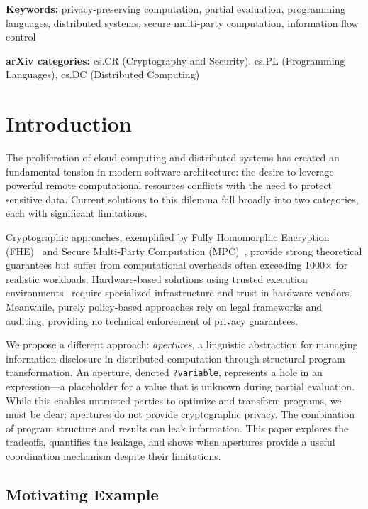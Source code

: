 \documentclass[12pt]{article}
\begin{document}
\vspace{1em}
\noindent\textbf{Keywords:} privacy-preserving computation, partial evaluation, programming languages, distributed systems, secure multi-party computation, information flow control

\vspace{1em}
\noindent\textbf{arXiv categories:} cs.CR (Cryptography and Security), cs.PL (Programming Languages), cs.DC (Distributed Computing)

\section{Introduction}

The proliferation of cloud computing and distributed systems has created an fundamental tension in modern software architecture: the desire to leverage powerful remote computational resources conflicts with the need to protect sensitive data. Current solutions to this dilemma fall broadly into two categories, each with significant limitations.

Cryptographic approaches, exemplified by Fully Homomorphic Encryption (FHE)~\cite{gentry2009fully} and Secure Multi-Party Computation (MPC)~\cite{yao1982protocols}, provide strong theoretical guarantees but suffer from computational overheads often exceeding 1000× for realistic workloads. Hardware-based solutions using trusted execution environments~\cite{costan2016intel} require specialized infrastructure and trust in hardware vendors. Meanwhile, purely policy-based approaches rely on legal frameworks and auditing, providing no technical enforcement of privacy guarantees.

We propose a different approach: \textit{apertures}, a linguistic abstraction for managing information disclosure in distributed computation through structural program transformation. An aperture, denoted \texttt{?variable}, represents a hole in an expression—a placeholder for a value that is unknown during partial evaluation. While this enables untrusted parties to optimize and transform programs, we must be clear: apertures do not provide cryptographic privacy. The combination of program structure and results can leak information. This paper explores the tradeoffs, quantifies the leakage, and shows when apertures provide a useful coordination mechanism despite their limitations.

\subsection{Motivating Example}
\end{document}
